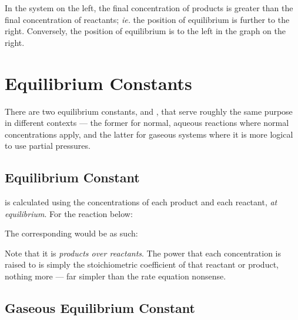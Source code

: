 				In the system on the left, the final concentration of products is greater than the final concentration of reactants;
				\textit{ie.} the position of equilibrium is further to the right. Conversely, the position of equilibrium is to the left
				in the graph on the right.





	\pagebreak
	\section{Equilibrium Constants}

		There are two equilibrium constants, \Kc{} and \Kp{}, that serve roughly the same purpose in different contexts --- the former for normal,
		aqueous reactions where normal concentrations apply, and the latter for gaseous systems where it is more logical to use partial pressures.

		\subsection{Equilibrium Constant \MKc{}}

			\Kc{} is calculated using the concentrations of each product and each reactant, \textit{at equilibrium}. For the reaction below:


			The corresponding \Kc{} would be as such:


			Note that it is \textit{products over reactants}. The power that each concentration is raised to is simply the stoichiometric
			coefficient of that reactant or product, nothing more --- far simpler than the rate equation nonsense.



		\subsection{Gaseous Equilibrium Constant \MKp{}}

